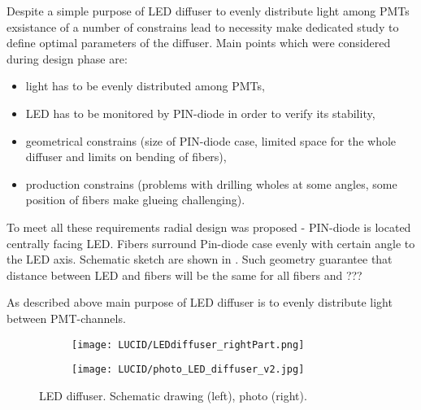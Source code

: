 Despite a simple purpose of LED diffuser to evenly distribute light among PMTs exsistance of a number of constrains lead to necessity make dedicated study 
to define optimal parameters of the diffuser. Main points which were considered during design phase are:
\begin{itemize}
 \item light has to be evenly distributed among PMTs,
 \item LED has to be monitored by PIN-diode in order to verify its stability,
 \item geometrical constrains (size of PIN-diode case, limited space for the whole diffuser and limits on bending of fibers),
 \item production constrains (problems with drilling wholes at some angles, some position of fibers make glueing challenging).
\end{itemize}

To meet all these requirements radial design was proposed - PIN-diode is located centrally facing LED. Fibers surround Pin-diode case 
evenly with certain angle to the LED axis. Schematic sketch are shown in .
Such geometry guarantee that distance between LED and fibers will be the same for all fibers and ???
  
As described above main purpose of LED diffuser is to evenly distribute light between PMT-channels. 





\begin{figure}
\begin{subfigure}{.48\textwidth}
  \centering
  \texttt{[image: LUCID/LEDdiffuser\_rightPart.png]}
\end{subfigure}
\begin{subfigure}{.48\textwidth}
  \centering
  \texttt{[image: LUCID/photo\_LED\_diffuser\_v2.jpg]}
\end{subfigure}

\caption{LED diffuser. Schematic drawing (left), photo (right).}
\label{fig:LEDDiffuser}
\end{figure}


